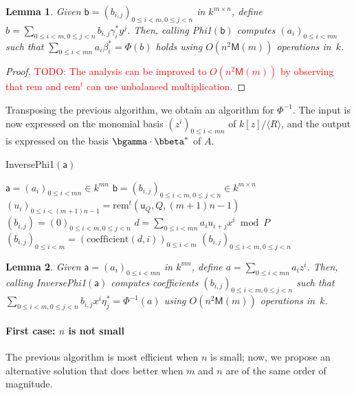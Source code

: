 \documentclass{sig-alternate}
\def\M {\ensuremath{\mathsf{M}}}
\def\va {\ensuremath{\mathsf{a}}}
\def\vu {\ensuremath{\mathsf{u}}}
\def\vb {\ensuremath{\mathsf{b}}}
\def\rem {\ensuremath{\mathrm{rem}}}
\def\coeff {\ensuremath{\mathrm{coefficient}}}
\newcommand{\ang}[1]{\langle#1\rangle}
\newcommand{\todo}[1]{\textcolor{red}{TODO: #1}}
\newtheorem{Lemma}{Lemma}
\begin{document}
\begin{Lemma}
  Given $\vb = (b_{i,j})_{0 \le i < m, 0 \le j < n}$ in $k^{m \times
    n}$, define $b=\sum_{0 \le i<m, 0 \le j < n} b_{i,j} \gamma^\ast_i
  y^j$. Then, calling {\em Phi1}$(\vb)$ computes $(a_i)_{0 \le
    i < mn}$ such that $\sum_{0 \le i < mn} a_i \beta^\ast_i =
  \Phi(b)$ holds using $O(n^2\M(m))$ operations in~$k$.
\end{Lemma}
\begin{proof}
  \todo{The analysis can be improved to $O(n^2\M(m))$ by observing
    that $\rem$ and $\rem^t$ can use unbalanced multiplication.}
\end{proof}

Transposing the previous algorithm, we obtain an algorithm for
$\Phi^{-1}$. The input is now expressed on the monomial basis
$(z^i)_{0 \le i < mn}$ of $k[z]/\ang{R}$, and the output is expressed
on the basis $\bgamma \cdot \bbeta^\ast$ of $A$.

\begin{algorithm}[H]
  \caption{InversePhi1$(\va)$}
  \begin{algorithmic}[1]
    \REQUIRE $\va = (a_{i})_{0 \le i < mn} \in k^{m n}$
    \ENSURE  $\vb = (b_{i,j})_{0 \le i < m, 0 \le j < n} \in k^{m \times n}$
    \STATE $(u_i)_{0\le i < (m+1)n-1} = \rem^t(\vu_Q,Q,(m+1)n-1)$
    \STATE $(b_{i,j}) = (0)_{0\le i < m, 0 \le j < n}$
    \STATE $d=\sum_{0 \le i < mn} a_i u_{i+j} x^i \bmod P$
    \STATE $(b_{i,j})_{0 \le i < m} = (\coeff(d,i))_{0 \le i < m}$
    \ENDFOR
    \RETURN $(b_{i,j})_{0 \le i < m, 0 \le j < n}$
  \end{algorithmic}
  \label{algo:iso1}
\end{algorithm}

\begin{Lemma}
  Given $\va = (a_{i})_{0 \le i < mn}$ in $k^{m n}$, define $a=\sum_{0
    \le i<mn} a_i z^i$. Then, calling {\em InversePhi1}$(\va)$
  computes coefficients $(b_{i,j})_{0 \le i < m, 0 \le j < n}$ such
  that $\sum_{0 \le i < m, 0 \le j < n} b_{i,j} x^i \eta^\ast_j =
  \Phi^{-1}(a)$ using $O(n^2\M(m))$ operations in~$k$.
\end{Lemma}

\paragraph*{{\bf \rm First case: $n$ is not small}}
The previous algorithm is most efficient when $n$ is small; now, we
propose an alternative solution that does better when $m$ and $n$ are
of the same order of magnitude.
\end{document}

